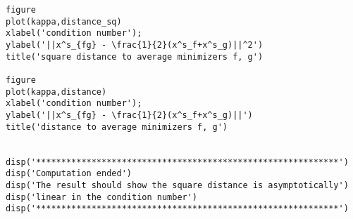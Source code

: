 \documentclass[11pt,a4paper]{article}
\begin{document}
\begin{lstlisting}
figure
plot(kappa,distance_sq)
xlabel('condition number');
ylabel('||x^s_{fg} - \frac{1}{2}(x^s_f+x^s_g)||^2')
title('square distance to average minimizers f, g')

figure
plot(kappa,distance)
xlabel('condition number');
ylabel('||x^s_{fg} - \frac{1}{2}(x^s_f+x^s_g)||')
title('distance to average minimizers f, g')


disp('************************************************************')
disp('Computation ended')
disp('The result should show the square distance is asymptotically')
disp('linear in the condition number')
disp('************************************************************')

\end{lstlisting}
\clearpage

{}
\end{document}
